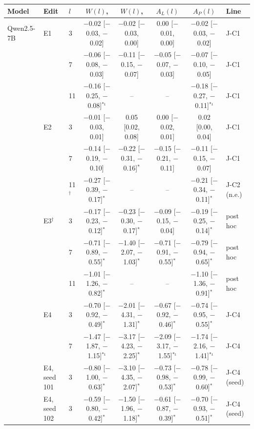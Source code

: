 \scriptsize
\setlength{\tabcolsep}{3pt}
\begin{tabular}{@{}lllcccc l@{}}
\toprule
Model & Edit & $l$ & $W(l)$, \fmtOpt{} & $W(l)$, \fmtPost{} & $A_L(l)$ & $A_P(l)$ & Line \\
\midrule
Qwen2.5-7B & E1 & 3 & $-$0.02 [$-$0.03, $-$0.02] & $-$0.02 [$-$0.03, 0.00] & 0.00 [$-$0.01, 0.00] & $-$0.02 [$-$0.03, $-$0.02] & J-C1 \\
 &  & 7 & $-$0.06 [$-$0.08, $-$0.03] & $-$0.11 [$-$0.15, $-$0.07] & $-$0.05 [$-$0.07, $-$0.03] & $-$0.07 [$-$0.10, $-$0.05] & J-C1 \\
 &  & 11 & $-$0.16 [$-$0.25, $-$0.08]$^{*\iota}$ & -- & -- & $-$0.18 [$-$0.27, $-$0.11]$^{*\iota}$ & J-C1 \\
 & E2 & 3 & $-$0.01 [$-$0.03, 0.01] & 0.05 [0.02, 0.08] & 0.00 [$-$0.02, 0.01] & 0.02 [0.00, 0.04] & J-C1 \\
 &  & 7 & $-$0.14 [$-$0.19, $-$0.10] & $-$0.22 [$-$0.31, $-$0.16]$^{*}$ & $-$0.15 [$-$0.21, $-$0.11] & $-$0.11 [$-$0.15, $-$0.07] & J-C1 \\
 &  & 11$^\dagger$ & $-$0.27 [$-$0.39, $-$0.17]$^{*}$ & -- & -- & $-$0.21 [$-$0.34, $-$0.11]$^{*}$ & J-C2 (n.e.) \\
 & E3$^\dagger$ & 3 & $-$0.17 [$-$0.23, $-$0.12]$^{*}$ & $-$0.23 [$-$0.30, $-$0.17]$^{*}$ & $-$0.09 [$-$0.15, $-$0.04] & $-$0.19 [$-$0.25, $-$0.14]$^{*}$ & post hoc \\
 &  & 7 & $-$0.71 [$-$0.89, $-$0.55]$^{*}$ & $-$1.40 [$-$2.07, $-$1.03]$^{*}$ & $-$0.71 [$-$0.91, $-$0.55]$^{*}$ & $-$0.79 [$-$0.94, $-$0.65]$^{*}$ & post hoc \\
 &  & 11 & $-$1.01 [$-$1.26, $-$0.82]$^{*}$ & -- & -- & $-$1.10 [$-$1.36, $-$0.91]$^{*}$ & post hoc \\
 & E4 & 3 & $-$0.70 [$-$0.92, $-$0.49]$^{*}$ & $-$2.01 [$-$4.31, $-$1.31]$^{*}$ & $-$0.67 [$-$0.92, $-$0.46]$^{*}$ & $-$0.74 [$-$0.95, $-$0.55]$^{*}$ & J-C4 \\
 &  & 7 & $-$1.47 [$-$1.87, $-$1.15]$^{*\iota}$ & $-$3.17 [$-$4.23, $-$2.25]$^{*}$ & $-$2.09 [$-$3.17, $-$1.55]$^{*\iota}$ & $-$1.74 [$-$2.16, $-$1.41]$^{*\iota}$ & J-C4 \\
 & E4, seed 101 & 3 & $-$0.80 [$-$1.00, $-$0.63]$^{*}$ & $-$3.10 [$-$4.35, $-$2.07]$^{*}$ & $-$0.73 [$-$0.98, $-$0.53]$^{*}$ & $-$0.78 [$-$0.99, $-$0.60]$^{*}$ & J-C4 (seed) \\
 & E4, seed 102 & 3 & $-$0.59 [$-$0.80, $-$0.42]$^{*}$ & $-$1.50 [$-$1.96, $-$1.18]$^{*}$ & $-$0.61 [$-$0.87, $-$0.39]$^{*}$ & $-$0.70 [$-$0.93, $-$0.51]$^{*}$ & J-C4 (seed) \\

\end{tabular}

